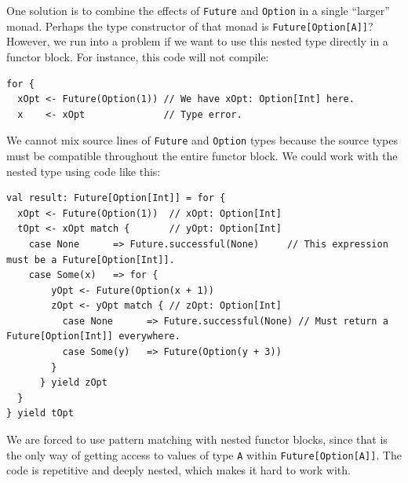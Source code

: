 One solution is to combine the effects of \lstinline!Future! and
\lstinline!Option! in a single \textsf{``}larger\textsf{''} monad. Perhaps the type
constructor of that monad is \lstinline!Future[Option[A]]!? However,
we run into a problem if we want to use this nested type directly
in a functor block. For instance, this code will not compile:
\begin{lstlisting}
for {
  xOpt <- Future(Option(1)) // We have xOpt: Option[Int] here.
  x    <- xOpt              // Type error.
\end{lstlisting}
We cannot mix source lines of \lstinline!Future! and \lstinline!Option!
types because the source types must be compatible throughout the entire
functor block. We could work with the nested type using code like
this:
\begin{lstlisting}
val result: Future[Option[Int]] = for {
  xOpt <- Future(Option(1))  // xOpt: Option[Int]
  tOpt <- xOpt match {       // yOpt: Option[Int]
    case None      => Future.successful(None)     // This expression must be a Future[Option[Int]].
    case Some(x)   => for {
        yOpt <- Future(Option(x + 1))
        zOpt <- yOpt match { // zOpt: Option[Int]
          case None      => Future.successful(None) // Must return a Future[Option[Int]] everywhere.
          case Some(y)   => Future(Option(y + 3))
        }
      } yield zOpt
  }
} yield tOpt
\end{lstlisting}
We are forced to use pattern matching with nested functor blocks,
since that is the only way of getting access to values of type \lstinline!A!
within \lstinline!Future[Option[A]]!. The code is repetitive and
deeply nested, which makes it hard to work with. 

